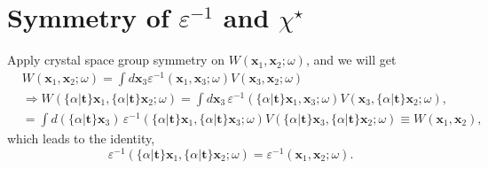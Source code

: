 \documentclass[11pt, oneside]{article}          %
\begin{document}
\section{Symmetry of $\varepsilon^{-1}$ and $\chi^{\star}$}
\label{sec:symmetry-epsilon-1}

Apply crystal space group symmetry on $W({\bm x}_1,{\bm x}_2;\omega)$, and we will get
\begin{equation}
  \label{eq:W_sym_R}
  \begin{aligned}
    & W({\bm x}_1,{\bm x}_2;\omega) = \int d{\bm x}_3 \varepsilon^{-1}({\bm x}_1,{\bm x}_3;\omega) V({\bm x}_3,{\bm x}_2;\omega) \\
    & \Rightarrow W(\{\alpha | {\bm t} \} {\bm x}_1, \{ \alpha | {\bm t} \} {\bm x}_2;\omega) = \int d {\bm x}_3 \, \varepsilon^{-1}(\{\alpha | {\bm t} \}{\bm x}_1,{\bm x}_3;\omega) V({\bm x}_3,\{\alpha | {\bm t} \} {\bm x}_2;\omega), \\
    & = \int d \left ( \{\alpha | {\bm t} \} {\bm x}_3 \right ) \, \varepsilon^{-1}(\{\alpha | {\bm t} \}{\bm x}_1,\{\alpha | {\bm t} \}{\bm x}_3;\omega) V( \{\alpha | {\bm t} \}{\bm x}_3,\{\alpha | {\bm t} \} {\bm x}_2;\omega) \equiv W({\bm x}_1,{\bm x}_2),
  \end{aligned}
\end{equation}
which leads to the identity,
\begin{equation}
  \label{eq:epsilon_R}
  \varepsilon^{-1}(\{\alpha | {\bm t} \} {\bm x}_1, \{\alpha | {\bm t} \}{\bm x}_2;\omega) = \varepsilon^{-1}({\bm x}_1,{\bm x}_2;\omega).
\end{equation}
\end{document}
